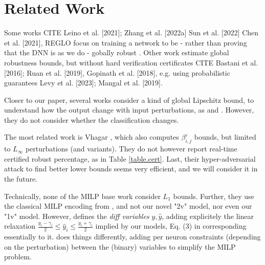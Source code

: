\section{Related Work}

Some works CITE
Leino et al. [2021]; Zhang et al. [2022a] Sun et al. [2022]  Chen et al. [2021], REGLO focus on training a network to be - rather than proving that the DNN is as we do - gobally robust .
Other work estimate global robustness bounds, but without hard verification certificates CITE Bastani et al. [2016]; Ruan et al. [2019], Gopinath et al. [2018], e.g. using probabilistic guarantees  Levy et al. [2023]; Mangal et al. [2019].

Closer to our paper, several works consider a kind of global Lipschitz bound, to understand how the output change with input perturbations, as \cite{Marabou} and \cite{ITNE,GROCET}. However, they do not consider whether the classification changes. 

The most related work is Vhagar \cite{vhagar}, which also computes $\beta^\varepsilon_{i,j}$ bounds, but limited to $L_\infty$ perturbations (and variants). They do not however report real-time certified robust percentage, as in Table \ref{table.cert}. Last, their hyper-adversarial attack to find better lower bounds seems very efficient, and we will consider it in the future.

Technically, none of the MILP base work \cite{vhagar,ITNE} 
consider $L_1$ bounds. Further, they use the classical MILP encoding from \cite{MILP}, and not our novel "2v" model, nor even our "1v" model. However, \cite{ITNE} 
defines the {\em diff variables} $y,\hat{y}$, adding explicitely the linear relaxation $\frac{y_i-\gamma_i}{2} \leq \hat{y}_i \leq \frac{y_i+\gamma_i}{2}$ implied by our models, Eq. (3) in \cite{ITNE} corresponding essentially to it. \cite{vhagar} does things differently, adding per neuron constraints (depending on the perturbation) between the (binary) variables to simplify the MILP problem. 


